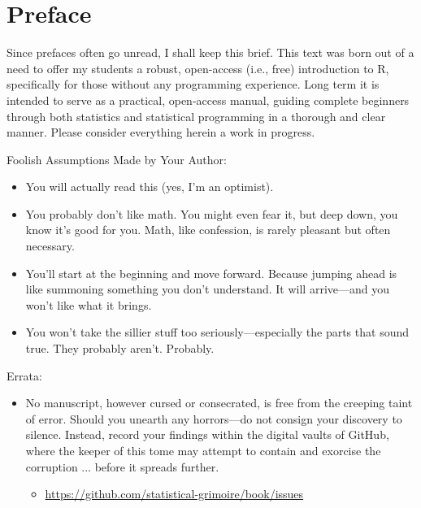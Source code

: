 \chapter*{Preface}
Since prefaces often go unread, I shall keep this brief. This text was born out of a need to offer my students a robust, open-access (i.e., free) introduction to R, specifically for those without any programming experience. Long term it is intended to serve as a practical, open-access manual, guiding complete beginners through both statistics and statistical programming in a thorough and clear manner. Please consider everything herein a work in progress.

\vspace{2em}

{
\headingfont \Large
\noindent Foolish Assumptions Made by Your Author:
\normalsize\normalfont
\begin{itemize}
    \item You will actually read this (yes, I'm an optimist).
    \item You probably don't like math. You might even fear it, but deep down, you know it's good for you. Math, like confession, is rarely pleasant but often necessary.
    \item You'll start at the beginning and move forward. Because jumping ahead is like summoning something you don't understand. It will arrive—and you won't like what it brings.
    \item You won't take the sillier stuff too seriously—especially the parts that sound true. They probably aren't. Probably.
\end{itemize}
}

\vspace{2em}

{
\headingfont \Large
\noindent Errata:
\normalsize\normalfont
\begin{itemize}
\item No manuscript, however cursed or consecrated, is free from the creeping taint of error. Should you unearth any horrors—do not consign your discovery to silence. Instead, record your findings within the digital vaults of GitHub, where the keeper of this tome may attempt to contain and exorcise the corruption ... before it spreads further.
    \begin{itemize}
        \item \url{https://github.com/statistical-grimoire/book/issues}
    \end{itemize}
\end{itemize}
}


